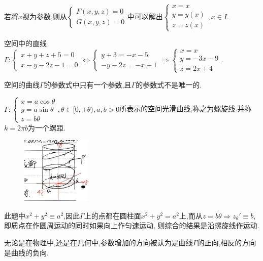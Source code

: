     若将$x$视为参数,则从$\begin{cases}
        F(x,y,z) = 0\\
        G(x,y,z) = 0
    \end{cases}$中可以解出$\begin{cases}
        x = x\\
        y = y(x)\\
        z = z(x)
    \end{cases},x \in I$.

\begin{example}
    空间中的直线$\Gamma:\begin{cases}
        x +y+z+5 =0\\
        x-y-2z -1=0
    \end{cases} \Leftrightarrow \begin{cases}
        y+3 = -x-5\\
        -y-2z = -x+1
    \end{cases} \Rightarrow \begin{cases}
        x = x\\
        y = -3x - 9\\
        z = 2x +4
    \end{cases}$.
\end{example}

\begin{remark}
    空间的曲线$\Gamma$的参数式中只有一个参数,且$\Gamma$的参数式不是唯一的.

\end{remark}

\begin{example}
    $\Gamma:\begin{cases}
        x = a \cos \theta\\
        y = a \sin \theta\\
        z = b \theta
    \end{cases},\theta \in [0,+\theta),a,b > 0$所表示的空间光滑曲线,称之为螺旋线.并称$k = 2\pi b$为一个螺距.

    \begin{figure}[htbp]
        \centering
        \includegraphics[width=0.3\textwidth]{figure/5-5.png}
        \caption{}
    \end{figure}

    此题中$x^2+y^2 \equiv a^2$,因此$\Gamma$上的点都在圆柱面$x^2+y^2 = a^2$上,而从$z = b \theta \Rightarrow z_\theta ' \equiv b$,即质点在作圆周运动的同时如果向上作匀速运动,
    则综合的结果是沿螺旋线作运动.

    无论是在物理中,还是在几何中,参数增加的方向被认为是曲线$\Gamma$的正向,相反的方向是曲线的负向.
\end{example}

